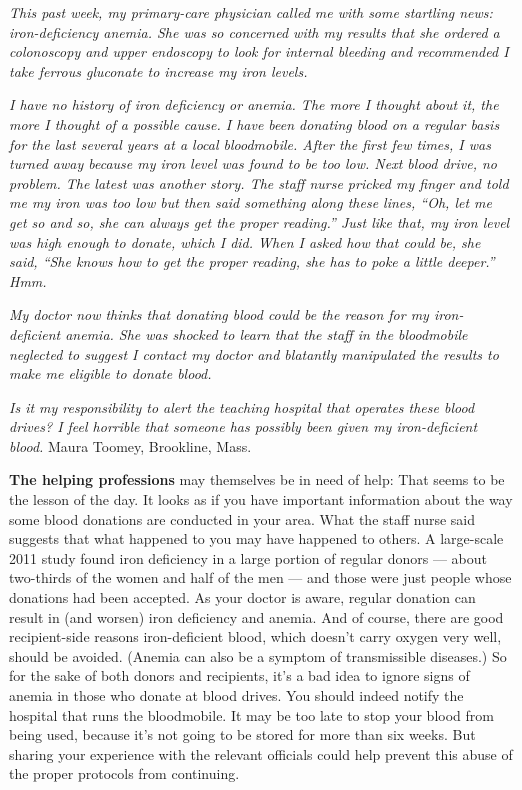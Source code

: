 \emph{This past week, my primary-care physician called me with some
startling news: iron-deficiency anemia. She was so concerned with my
results that she ordered a colonoscopy and upper endoscopy to look for
internal bleeding and recommended I take ferrous gluconate to increase
my iron levels.}

\emph{I have no history of iron deficiency or anemia. The more I thought
about it, the more I thought of a possible cause. I have been donating
blood on a regular basis for the last several years at a local
bloodmobile. After the first few times, I was turned away because my
iron level was found to be too low. Next blood drive, no problem. The
latest was another story. The staff nurse pricked my finger and told me
my iron was too low but then said something along these lines, ``Oh, let
me get so and so, she can always get the proper reading.'' Just like
that, my iron level was high enough to donate, which I did. When I asked
how that could be, she said, ``She knows how to get the proper reading,
she has to poke a little deeper.'' Hmm.}

\emph{My doctor now thinks that donating blood could be the reason for
my iron-deficient anemia. She was shocked to learn that the staff in the
bloodmobile neglected to suggest I contact my doctor and blatantly
manipulated the results to make me eligible to donate blood.}

\emph{Is it my responsibility to alert the teaching hospital that
operates these blood drives? I feel horrible that someone has possibly
been given my iron-deficient blood.} Maura Toomey, Brookline, Mass.

\textbf{The helping professions} may themselves be in need of help: That
seems to be the lesson of the day. It looks as if you have important
information about the way some blood donations are conducted in your
area. What the staff nurse said suggests that what happened to you may
have happened to others. A large-scale 2011 study found iron deficiency
in a large portion of regular donors --- about two-thirds of the women
and half of the men --- and those were just people whose donations had
been accepted. As your doctor is aware, regular donation can result in
(and worsen) iron deficiency and anemia. And of course, there are good
recipient-side reasons iron-deficient blood, which doesn't carry oxygen
very well, should be avoided. (Anemia can also be a symptom of
transmissible diseases.) So for the sake of both donors and recipients,
it's a bad idea to ignore signs of anemia in those who donate at blood
drives. You should indeed notify the hospital that runs the bloodmobile.
It may be too late to stop your blood from being used, because it's not
going to be stored for more than six weeks. But sharing your experience
with the relevant officials could help prevent this abuse of the proper
protocols from continuing.

